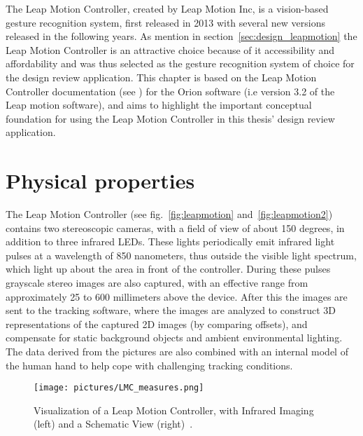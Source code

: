 The Leap Motion Controller, created by Leap Motion Inc, is a vision-based gesture recognition system, first released in 2013 with several new versions released in the following
years. As mention in section~\vref{sec:design_leapmotion} the Leap Motion Controller is an attractive choice because of it accessibility and affordability and was thus 
selected as the gesture recognition system of choice for the design review application. 
This chapter is based on the Leap Motion Controller documentation (see \citet{LeapMotion2016}) for the Orion software (i.e version 3.2 of the Leap motion software), 
and aims to highlight the important conceptual foundation for using the Leap Motion Controller in this thesis' design review application.


\section{Physical properties}
The Leap Motion Controller (see fig.~\vref{fig:leapmotion} and~\vref{fig:leapmotion2}) contains two stereoscopic cameras, with a field of view of about 150 degrees, 
in addition to three infrared LEDs. 
These lights periodically emit infrared light pulses at a wavelength of 850 nanometers, thus outside the visible light spectrum, which light up about the 
area in front of the controller. During these pulses grayscale stereo images are also captured, with an effective range from approximately 25 to 600 millimeters above the device.
After this the images are sent to the tracking software, where the images are analyzed to construct 3D representations of the captured 2D images (by comparing offsets), and
compensate for static background objects and ambient environmental lighting. 
The data derived from the pictures are also combined with an internal model of the human hand to help cope with challenging tracking conditions.

\begin{figure}%
	\texttt{[image: pictures/LMC\_measures.png]}
	\caption[Visualization of a Leap Motion Controller]{Visualization of a Leap Motion Controller, with Infrared Imaging (left) and a Schematic View (right)~\citep{Weichert2013}.}
	\label{fig:leapmotion2}
\end{figure} 


